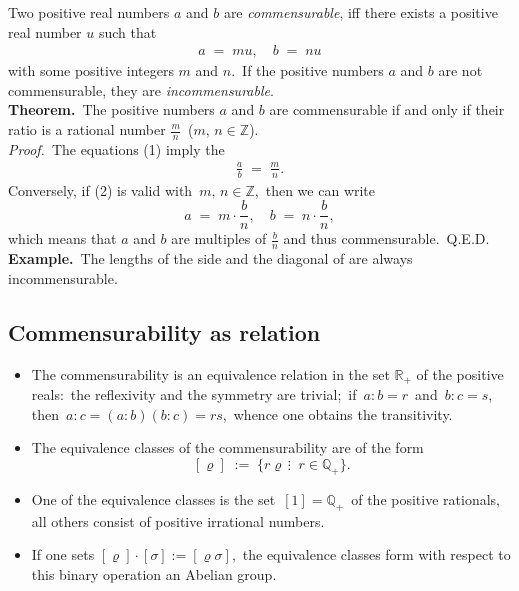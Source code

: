 \documentclass[12pt]{article}
\theoremstyle{definition}
\begin{document}
Two positive real numbers $a$ and $b$ are {\em commensurable}, iff there exists a positive real number $u$ such that
\begin{align}
a \;=\; mu, \quad b \;=\; nu
\end{align}
with some positive integers $m$ and $n$.\, If the positive numbers $a$ and $b$ are not commensurable, they are {\em incommensurable}.\\

\textbf{Theorem.}\, The positive numbers $a$ and $b$ are commensurable if and only if their ratio is a rational number 
$\displaystyle\frac{m}{n}$\, ($m,\,n \in \mathbb{Z}$).\\

{\em Proof.}\, The equations (1) imply the 
\begin{align}
\frac{a}{b} \;=\; \frac{m}{n}.
\end{align}
Conversely, if (2) is valid with\, $m,\,n \in \mathbb{Z}$,\, then we can write
$$a \;=\; m\!\cdot\!\frac{b}{n}, \quad b \;=\; n\!\cdot\!\frac{b}{n},$$
which means that $a$ and $b$ are multiples of $\displaystyle\frac{b}{n}$ and thus commensurable.\, Q.E.D.\\

\textbf{Example.}\, The lengths of the side and the diagonal of  are always incommensurable.

\subsection{Commensurability as relation}

\begin{itemize}

\item The commensurability is an equivalence relation in the set $\mathbb{R}_+$ of the positive reals:\, the reflexivity and the symmetry are trivial;\, if\, $a\!:\!b = r$\, and\, $b\!:\!c = s$,\, then\, $a\!:\!c = (a\!:\!b)(b\!:\!c) = rs$,\, whence one obtains the transitivity.\\

\item The equivalence classes of the commensurability are of the form
$$[\varrho] \;:=\; \{r\varrho\,\vdots\;\; r \in \mathbb{Q}_+\}.$$

\item One of the equivalence classes is the set\, $[1] = \mathbb{Q}_+$\, of the positive rationals, all others consist of positive irrational numbers.

\item If one sets\; $[\varrho]\!\cdot\![\sigma] := [\varrho\sigma]$,\, the equivalence classes form with respect to this binary operation an Abelian group.

\end{itemize}

\end{document}
